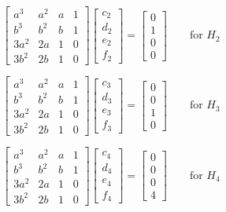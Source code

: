 \documentclass[10pt]{article}
\newcommand{\beq}{\begin{equation}}
\newcommand{\eeq}{\end{equation}}
\begin{document}
\beq
\begin{bmatrix}
a^3 & a^2 & a & 1\\
b^3 & b^2 & b & 1\\
3a^2 & 2a & 1 & 0\\
3b^2 & 2b & 1 & 0
\end{bmatrix}
\begin{bmatrix}
c_2 \\d_2 \\e_2 \\f_2
\end{bmatrix}
=
\begin{bmatrix}
0 \\ 1 \\ 0 \\ 0
\end{bmatrix}
\quad\quad \textrm{for } H_2
\eeq

\beq
\begin{bmatrix}
a^3 & a^2 & a & 1\\
b^3 & b^2 & b & 1\\
3a^2 & 2a & 1 & 0\\
3b^2 & 2b & 1 & 0
\end{bmatrix}
\begin{bmatrix}
c_3 \\d_3 \\e_3 \\f_3
\end{bmatrix}
=
\begin{bmatrix}
0 \\ 0 \\ 1 \\ 0
\end{bmatrix}
\quad\quad \textrm{for } H_3
\eeq

\beq
\begin{bmatrix}
a^3 & a^2 & a & 1\\
b^3 & b^2 & b & 1\\
3a^2 & 2a & 1 & 0\\
3b^2 & 2b & 1 & 0
\end{bmatrix}
\begin{bmatrix}
c_4 \\d_4 \\e_4 \\f_4
\end{bmatrix}
=
\begin{bmatrix}
0 \\ 0 \\ 0 \\ 4
\end{bmatrix}
\quad\quad \textrm{for } H_4
\eeq
\end{document}

